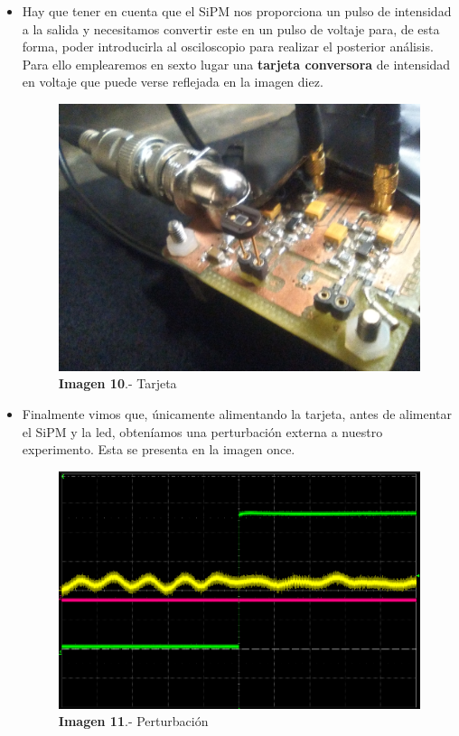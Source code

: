 \documentclass[11pt, a4paper]{article}
\begin{document}
\begin{itemize}
\item {} Hay que tener en cuenta que el SiPM nos proporciona un pulso de intensidad a la salida y  necesitamos convertir este en un pulso de voltaje para, de esta forma, poder introducirla al osciloscopio para realizar el posterior análisis. Para ello emplearemos en sexto lugar una \textbf{tarjeta conversora} de intensidad en voltaje que puede verse reflejada en la imagen diez. 

\begin{figure}[hbtp]
\centering
\includegraphics[scale=0.2]{tarjeta.png}
\caption{\textbf{Imagen 10}.- Tarjeta}
\end{figure}

\newpage
\item {} Finalmente vimos que, únicamente alimentando la tarjeta, antes de alimentar el SiPM y la led, obteníamos una perturbación externa a nuestro experimento. Esta se presenta en la imagen once. 

\begin{figure}[hbtp]
\centering
\includegraphics[scale=0.2]{ruido.png}
\caption{\textbf{Imagen 11}.- Perturbación}
\end{figure}


\end{itemize}
\end{document}
